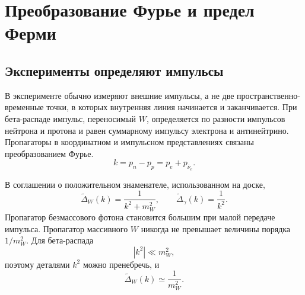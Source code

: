 \begin{classroomqa}
\end{classroomqa}

\section{Преобразование Фурье и предел Ферми}

\subsection{Эксперименты определяют импульсы}

В эксперименте обычно измеряют внешние импульсы, а не две пространственно-временные точки, в которых внутренняя линия начинается и заканчивается. При бета-распаде импульс, переносимый \(W\), определяется по разности импульсов нейтрона и протона и равен суммарному импульсу электрона и антинейтрино. Пропагаторы в координатном и импульсном представлениях связаны преобразованием Фурье.
\begin{equation}
  k=p_n-p_p=p_e+p_{\bar\nu_e}.
\end{equation}

В соглашении о положительном знаменателе, использованном на доске,
\begin{equation}
  \widetilde{\Delta}_W(k)=\frac1{k^2+m_W^2},
  \qquad
  \widetilde{\Delta}_\gamma(k)=\frac1{k^2}.
\end{equation}
Пропагатор безмассового фотона становится большим при малой передаче импульса. Пропагатор массивного \(W\) никогда не превышает величины порядка \(1/m_W^2\). Для бета-распада
\begin{equation}
  |k^2|\ll m_W^2,
\end{equation}
поэтому деталями \(k^2\) можно пренебречь, и
\begin{equation}
  \widetilde{\Delta}_W(k)\simeq\frac1{m_W^2}.
\end{equation}

